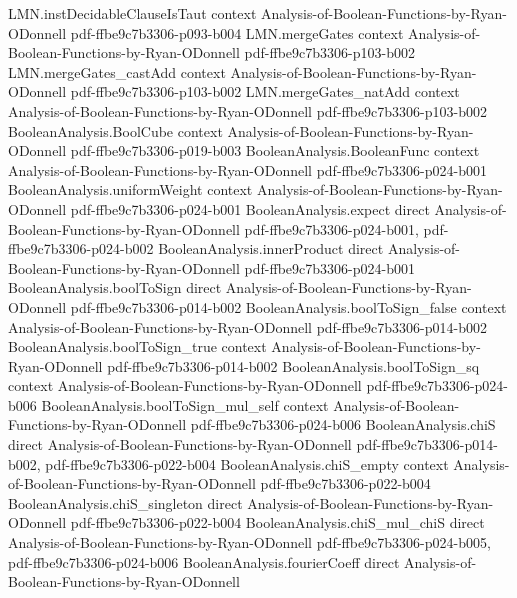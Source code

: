 \begin{theorem}
  {LMN.instDecidableClauseIsTaut}
  {context}
  {Analysis-of-Boolean-Functions-by-Ryan-ODonnell}
  {pdf-ffbe9c7b3306-p093-b004}
\proofstep
  {LMN.mergeGates}
  {context}
  {Analysis-of-Boolean-Functions-by-Ryan-ODonnell}
  {pdf-ffbe9c7b3306-p103-b002}
\proofstep
  {LMN.mergeGates_castAdd}
  {context}
  {Analysis-of-Boolean-Functions-by-Ryan-ODonnell}
  {pdf-ffbe9c7b3306-p103-b002}
\proofstep
  {LMN.mergeGates_natAdd}
  {context}
  {Analysis-of-Boolean-Functions-by-Ryan-ODonnell}
  {pdf-ffbe9c7b3306-p103-b002}
\proofstep
  {BooleanAnalysis.BoolCube}
  {context}
  {Analysis-of-Boolean-Functions-by-Ryan-ODonnell}
  {pdf-ffbe9c7b3306-p019-b003}
\proofstep
  {BooleanAnalysis.BooleanFunc}
  {context}
  {Analysis-of-Boolean-Functions-by-Ryan-ODonnell}
  {pdf-ffbe9c7b3306-p024-b001}
\proofstep
  {BooleanAnalysis.uniformWeight}
  {context}
  {Analysis-of-Boolean-Functions-by-Ryan-ODonnell}
  {pdf-ffbe9c7b3306-p024-b001}
\proofstep
  {BooleanAnalysis.expect}
  {direct}
  {Analysis-of-Boolean-Functions-by-Ryan-ODonnell}
  {pdf-ffbe9c7b3306-p024-b001,
    pdf-ffbe9c7b3306-p024-b002}
\proofstep
  {BooleanAnalysis.innerProduct}
  {direct}
  {Analysis-of-Boolean-Functions-by-Ryan-ODonnell}
  {pdf-ffbe9c7b3306-p024-b001}
\proofstep
  {BooleanAnalysis.boolToSign}
  {direct}
  {Analysis-of-Boolean-Functions-by-Ryan-ODonnell}
  {pdf-ffbe9c7b3306-p014-b002}
\proofstep
  {BooleanAnalysis.boolToSign_false}
  {context}
  {Analysis-of-Boolean-Functions-by-Ryan-ODonnell}
  {pdf-ffbe9c7b3306-p014-b002}
\proofstep
  {BooleanAnalysis.boolToSign_true}
  {context}
  {Analysis-of-Boolean-Functions-by-Ryan-ODonnell}
  {pdf-ffbe9c7b3306-p014-b002}
\proofstep
  {BooleanAnalysis.boolToSign_sq}
  {context}
  {Analysis-of-Boolean-Functions-by-Ryan-ODonnell}
  {pdf-ffbe9c7b3306-p024-b006}
\proofstep
  {BooleanAnalysis.boolToSign_mul_self}
  {context}
  {Analysis-of-Boolean-Functions-by-Ryan-ODonnell}
  {pdf-ffbe9c7b3306-p024-b006}
\proofstep
  {BooleanAnalysis.chiS}
  {direct}
  {Analysis-of-Boolean-Functions-by-Ryan-ODonnell}
  {pdf-ffbe9c7b3306-p014-b002,
    pdf-ffbe9c7b3306-p022-b004}
\proofstep
  {BooleanAnalysis.chiS_empty}
  {context}
  {Analysis-of-Boolean-Functions-by-Ryan-ODonnell}
  {pdf-ffbe9c7b3306-p022-b004}
\proofstep
  {BooleanAnalysis.chiS_singleton}
  {direct}
  {Analysis-of-Boolean-Functions-by-Ryan-ODonnell}
  {pdf-ffbe9c7b3306-p022-b004}
\proofstep
  {BooleanAnalysis.chiS_mul_chiS}
  {direct}
  {Analysis-of-Boolean-Functions-by-Ryan-ODonnell}
  {pdf-ffbe9c7b3306-p024-b005,
    pdf-ffbe9c7b3306-p024-b006}
\proofstep
  {BooleanAnalysis.fourierCoeff}
  {direct}
  {Analysis-of-Boolean-Functions-by-Ryan-ODonnell}

\end{theorem}
